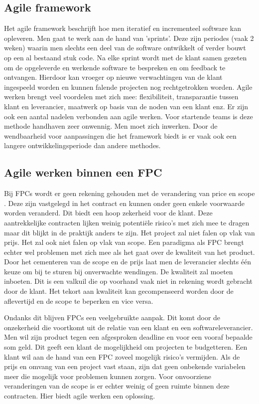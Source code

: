 \documentclass{hogent-article}
\begin{document}
    \subsection{Agile framework}
    Het agile framework beschrijft hoe men iteratief en incrementeel software kan opleveren. Men gaat te werk aan de hand van 'sprints'. Deze zijn periodes (vaak 2 weken) waarin men slechts een deel van de software ontwikkelt of verder bouwt op een al bestaand stuk code. Na elke sprint wordt met de klant samen gezeten om de opgeleverde en werkende software te bespreken en om feedback te ontvangen. Hierdoor kan vroeger op nieuwe verwachtingen van de klant ingespeeld worden en kunnen falende projecten nog rechtgetrokken worden.
    Agile werken brengt veel voordelen met zich mee: flexibiliteit, transparantie tussen klant en leverancier, maatwerk op basis van de noden van een klant enz. Er zijn ook een aantal nadelen verbonden aan agile werken. Voor startende teams is deze methode handhaven zeer onwennig. Men moet zich inwerken. Door de wendbaarheid voor aanpassingen die het framework biedt is er vaak ook een langere ontwikkelingsperiode dan andere methodes.
    
    \subsection{Agile werken binnen een FPC}
	Bij FPCs wordt er geen rekening gehouden met de verandering van price en scope \autocite{SCRUM2012}. Deze zijn vastgelegd in het contract en kunnen onder geen enkele voorwaarde worden veranderd. Dit biedt een hoop zekerheid voor de klant. Deze aantrekkelijke contracten lijken weinig potentiële risico's met zich mee te dragen maar dit blijkt in de praktijk anders te zijn. Het project zal niet falen op vlak van prijs. Het zal ook niet falen op vlak van scope. Een paradigma als FPC brengt echter wel problemen met zich mee als het gaat over de kwaliteit van het product. Door het cementeren van de scope en de prijs laat men de leverancier slechts één keuze om bij te sturen bij onverwachte wendingen. De kwaliteit zal moeten inboeten. Dit is een valkuil die op voorhand vaak niet in rekening wordt gebracht door de klant. Het tekort aan kwaliteit kan gecompenseerd worden door de aflevertijd en de scope te beperken en vice versa.
    
    Ondanks dit blijven FPCs een veelgebruikte aanpak. Dit komt door de onzekerheid die voortkomt uit de relatie van een klant en een softwareleverancier. Men wil zijn product tegen een afgesproken deadline en voor een vooraf bepaalde som geld. Dit geeft een klant de mogelijkheid om projecten te budgetteren.  Een klant wil aan de hand van een FPC zoveel mogelijk risico's vermijden. Als de prijs en omvang van een project vast staan, zijn dat geen onbekende variabelen meer die mogelijk voor problemen kunnen zorgen. Voor onvoorziene veranderingen van de scope is er echter weinig of geen ruimte binnen deze contracten. Hier biedt agile werken een oplossing.
    
\end{document}
